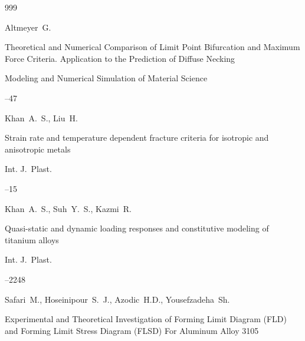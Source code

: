 \begin{thebibliography}{999}




\by  Altmeyer~G. 

\paper Theoretical and Numerical Comparison of Limit Point Bifurcation and Maximum Force Criteria. Application to the Prediction of Diffuse Necking  

\jour  Modeling and Numerical Simulation of Material Science




--47





\by Khan~A.~S., Liu~H. 

\paper Strain rate and temperature dependent fracture criteria for isotropic and anisotropic metals

\jour Int. J.~Plast.  



--15






\by Khan~A.~S., Suh~Y.~S., Kazmi~R. 

\paper Quasi-static and dynamic loading responses and constitutive modeling of titanium alloys

\jour Int. J.~Plast.  




–2248






\by Safari~M., Hoseinipour~S.~J.,  Azodic~H.D., Yousefzadeha~Sh. 

\paper Experimental and Theoretical Investigation of Forming Limit Diagram (FLD) and Forming Limit Stress Diagram (FLSD) For Aluminum Alloy 3105


\end{thebibliography}
